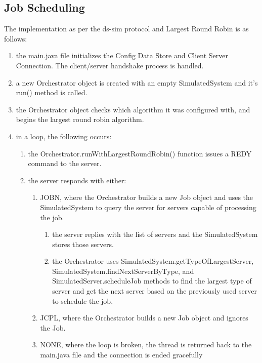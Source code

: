 \documentclass[a4paper]{article}
\begin{document}
\subsection{Job Scheduling}
The implementation as per the ds-sim protocol and Largest Round Robin is as follows:
\begin{enumerate}
    \item the main.java file initializes the Config Data Store and Client Server Connection. The client/server handshake process is handled.
    \item a new Orchestrator object is created with an empty SimulatedSystem and it's run() method is called.
    \item the Orchestrator object checks which algorithm it was configured with, and begins the largest round robin algorithm.
    \item in a loop, the following occurs:
    \begin{enumerate}
        \item the Orchestrator.runWithLargestRoundRobin() function issues a REDY command to the server.
        \item the server responds with either:
        \begin{enumerate}
            \item JOBN, where the Orchestrator builds a new Job object and uses the SimulatedSystem to query the server for servers capable of processing the job.
            \begin{enumerate}
                \item the server replies with the list of servers and the SimulatedSystem stores those servers.
                \item the Orchestrator uses SimulatedSystem.getTypeOfLargestServer, SimulatedSystem.findNextServerByType, and SimulatedServer.scheduleJob methods to find the largest type of server and get the next server based on the previously used server to schedule the job.
            \end{enumerate}
            \item JCPL, where the Orchestrator builds a new Job object and ignores the Job.
            \item NONE, where the loop is broken, the thread is returned back to the main.java file and the connection is ended gracefully
        \end{enumerate}
    \end{enumerate}
\end{enumerate}
\end{document}
